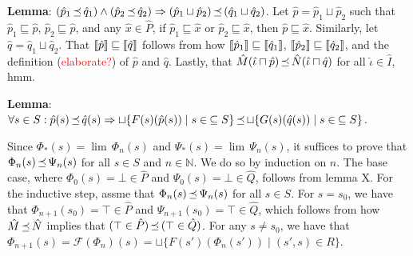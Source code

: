 \textbf{Lemma}: $(\hat p_{1} \operatorname{\mathrel{\preceq}} \hat q_{1}) \wedge (\hat p_{2} \operatorname{\mathrel{\preceq}} \hat q_{2}) \Rightarrow (\hat p_{1} \sqcup \hat p_{2}) \operatorname{\mathrel{\preceq}} \, (\hat q_{1} \sqcup \hat q_{2})$. Let $\hat p = \hat p_{1} \sqcup \hat p_{2}$ such that $\hat p_{1} \sqsubseteq \hat p$, $\hat p_{2} \sqsubseteq \hat p$, and any $\hat x \in \hat P$, if $\hat p_{1} \sqsubseteq \hat x$ or $\hat p_{2} \sqsubseteq \hat x$, then $\hat p \sqsubseteq \hat x$. Similarly, let $\hat q = \hat q_{1} \sqcup \hat q_{2}$. That $\llbracket\hat p\rrbracket \sqsubseteq \llbracket\hat q\rrbracket$ follows from how $\llbracket\hat p_{1}\rrbracket \sqsubseteq \llbracket\hat q_{1}\rrbracket$, $\llbracket\hat p_{2}\rrbracket \sqsubseteq \llbracket\hat q_{2}\rrbracket$, and the definition (\textcolor{red}{elaborate?}) of $\hat p$ and $\hat q$. Lastly, that $\hat M(\hat \iota \sqcap \hat p) \operatorname{\mathrel{\preceq}} \hat N(\hat \iota \sqcap \hat q)$ for all $\hat \iota \in \hat I$, hmm.

\textbf{Lemma}: $\forall s \in S : \hat p(s) \operatorname{\mathrel{\preceq}} \hat q(s) \Rightarrow \sqcup \{ F(s)(\hat p(s)) \mid s \in \: \subseteq S \} \operatorname{\mathrel{\preceq}} \sqcup \{ G(s)(\hat q(s)) \mid s \in \: \subseteq S \}$.

Since $\Phi_{*}(s) = \lim \, \Phi_{n}(s)$ and $\Psi_{*}(s) = \lim \, \Psi_{n}(s)$, it suffices to prove that $\Phi_{n}(s) \operatorname{\mathrel{\preceq}} \Psi_{n}(s)$ for all $s \in S$ and $n \in \mathbb{N}$. We do so by induction on $n$. The base case, where $\Phi_{0}(s) = \bot \in \hat P$ and $\Psi_{0}(s) = \bot \in \hat Q$, follows from lemma X. For the inductive step, assme that $\Phi_{n}(s) \operatorname{\mathrel{\preceq}} \Psi_{n}(s)$ for all $s \in S$. For $s = s_{0}$, we have that $\Phi_{n+1}(s_{0}) = \top \in \hat P$ and $\Psi_{n+1}(s_{0}) = \top \in \hat Q$, which follows from how $\hat M \operatorname{\mathrel{\preceq}} \hat N$ implies that $(\top \in \hat P) \operatorname{\mathrel{\preceq}} \, (\top \in \hat Q)$. For any $s \neq s_{0}$, we have that $\Phi_{n+1}(s) = \mathcal{F}(\Phi_{n})(s) = \sqcup \{ F(s')(\Phi_{n}(s')) \mid (s',s) \in R \}$.

